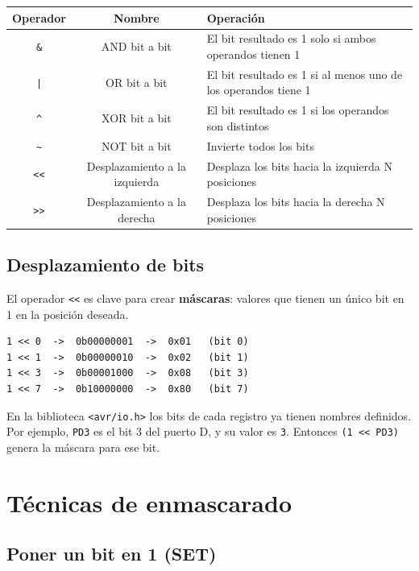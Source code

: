 \begin{table}[H]
\centering
\begin{tabular}{ccl}
\toprule
\textbf{Operador} & \textbf{Nombre} & \textbf{Operación} \\
\midrule
\texttt{\&}  & AND bit a bit                    & El bit resultado es 1 solo si ambos operandos tienen 1 \\
\texttt{|}   & OR bit a bit                     & El bit resultado es 1 si al menos uno de los operandos tiene 1 \\
\texttt{\^{}}& XOR bit a bit                    & El bit resultado es 1 si los operandos son distintos \\
\texttt{\~{}}& NOT bit a bit                    & Invierte todos los bits \\
\texttt{<<}  & Desplazamiento a la izquierda    & Desplaza los bits hacia la izquierda N posiciones \\
\texttt{>>}  & Desplazamiento a la derecha      & Desplaza los bits hacia la derecha N posiciones \\
\bottomrule
\end{tabular}
\end{table}

\subsection{Desplazamiento de bits}

El operador \texttt{<<} es clave para crear \textbf{máscaras}: valores que tienen un
único bit en 1 en la posición deseada.

\begin{lstlisting}[style=estilo-c]
1 << 0  ->  0b00000001  ->  0x01   (bit 0)
1 << 1  ->  0b00000010  ->  0x02   (bit 1)
1 << 3  ->  0b00001000  ->  0x08   (bit 3)
1 << 7  ->  0b10000000  ->  0x80   (bit 7)
\end{lstlisting}

En la biblioteca \texttt{<avr/io.h>} los bits de cada registro ya tienen nombres
definidos. Por ejemplo, \texttt{PD3} es el bit 3 del puerto D, y su valor es
\texttt{3}. Entonces \texttt{(1 << PD3)} genera la máscara para ese bit.

\section{Técnicas de enmascarado}

\subsection{Poner un bit en 1 (SET)}

